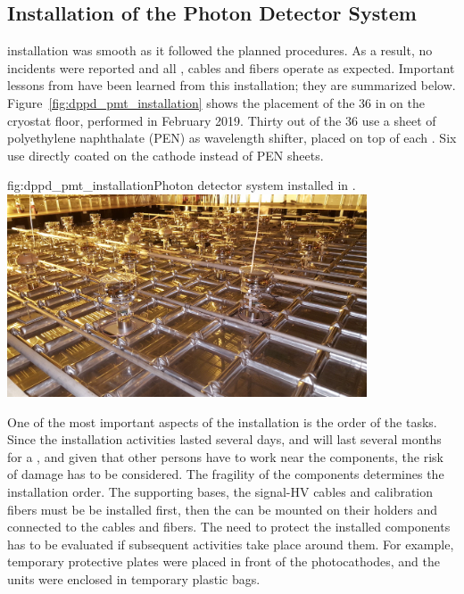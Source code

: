 
\subsection{Installation of the  Photon Detector System}

  installation was smooth as it followed the planned procedures. As a result, no incidents were reported and all , cables and fibers operate as expected. Important lessons from  have been learned from this installation; %
they are summarized below. Figure~\ref{fig:dppd_pmt_installation} shows the placement of the \num{36}  in  on the cryostat floor, performed in February 2019.
 Thirty out of the \num{36}  use a sheet of polyethylene naphthalate
(PEN) as wavelength shifter, placed on top of each . Six  use  directly coated on
the  cathode instead of PEN sheets.

\begin{dunefigure}{fig:dppd_pmt_installation}{Photon detector system installed in .}
\includegraphics[width=0.8\textwidth]{graphics/dppd_pmt_installation.jpg}
\end{dunefigure}

One of the most important aspects of the installation is the order of the tasks. Since the   installation activities lasted several days, %
and will last several months for a , and given that other persons have to work near the  components, the risk of damage has to be considered. The fragility of the components determines the installation order. The  supporting bases, the signal-HV  cables and calibration fibers must be be installed first, then the  can be mounted on their holders and connected to the cables and fibers. The need to protect the installed components has to be evaluated if subsequent activities take place around them. For example,  temporary protective plates were placed in front of the   photocathodes, and the  units were enclosed in temporary plastic bags. 

